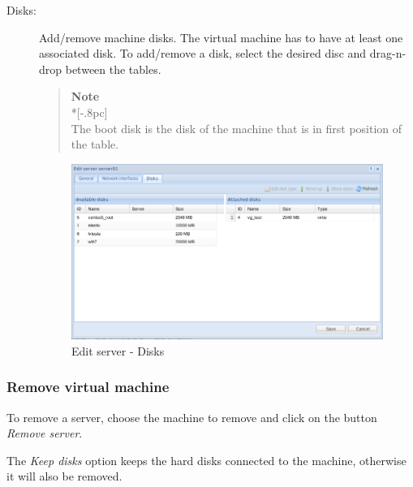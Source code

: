\begin{description}
	\item[Disks:] Add/remove machine disks. The virtual machine has to have at least one associated disk.
                To add/remove a disk, select the desired disc and drag-n-drop between the tables.
                    
                \begin{quote}
                    {\large \bf Note} \\*[-.8pc]
                    \underline{\hspace{6in}} \\
                    The boot disk is the disk of the machine that is in first position of the table.
                \end{quote}
                    
		\begin{figure}[H]
        		\begin{center}
		        \includegraphics[scale=0.5]{screenshots/server_edit_disks.png}
        		\caption{Edit server - Disks}
		        \label{fig:server_edit_disks}
	        	\end{center}
		\end{figure}

\end{description}



\subsubsection{Remove virtual machine}
\label{sec:remove_server}
To remove a server, choose the machine to remove and click on the button \emph{Remove server}.

The \emph{Keep disks} option keeps the hard disks connected to the machine, otherwise it will also be removed.
		
